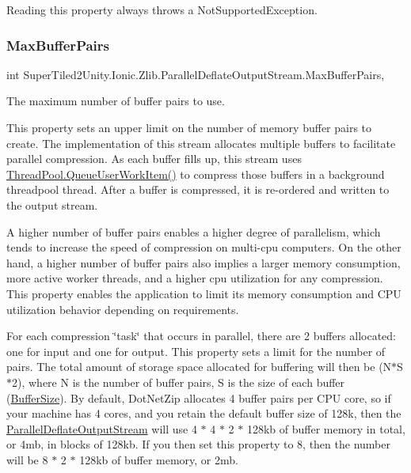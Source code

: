 Reading this property always throws a Not\+Supported\+Exception. 

\mbox{\label{class_super_tiled2_unity_1_1_ionic_1_1_zlib_1_1_parallel_deflate_output_stream_af01b47be83fda8e9e04a009ef8b4b7f2}} 
\subsubsection{\texorpdfstring{Max\+Buffer\+Pairs}{MaxBufferPairs}}
{\footnotesize\ttfamily int Super\+Tiled2\+Unity.\+Ionic.\+Zlib.\+Parallel\+Deflate\+Output\+Stream.\+Max\+Buffer\+Pairs\hspace{0.3cm}{\ttfamily [get]}, {\ttfamily [set]}}



The maximum number of buffer pairs to use. 

This property sets an upper limit on the number of memory buffer pairs to create. The implementation of this stream allocates multiple buffers to facilitate parallel compression. As each buffer fills up, this stream uses \mbox{\hyperlink{}{Thread\+Pool.\+Queue\+User\+Work\+Item()}} to compress those buffers in a background threadpool thread. After a buffer is compressed, it is re-\/ordered and written to the output stream. 

A higher number of buffer pairs enables a higher degree of parallelism, which tends to increase the speed of compression on multi-\/cpu computers. On the other hand, a higher number of buffer pairs also implies a larger memory consumption, more active worker threads, and a higher cpu utilization for any compression. This property enables the application to limit its memory consumption and C\+PU utilization behavior depending on requirements. 

For each compression \char`\"{}task\char`\"{} that occurs in parallel, there are 2 buffers allocated\+: one for input and one for output. This property sets a limit for the number of pairs. The total amount of storage space allocated for buffering will then be (N$\ast$\+S$\ast$2), where N is the number of buffer pairs, S is the size of each buffer (\mbox{\hyperlink{class_super_tiled2_unity_1_1_ionic_1_1_zlib_1_1_parallel_deflate_output_stream_acf40fcb2a35fc142e82004ae56761496}{Buffer\+Size}}). By default, Dot\+Net\+Zip allocates 4 buffer pairs per C\+PU core, so if your machine has 4 cores, and you retain the default buffer size of 128k, then the \mbox{\hyperlink{class_super_tiled2_unity_1_1_ionic_1_1_zlib_1_1_parallel_deflate_output_stream}{Parallel\+Deflate\+Output\+Stream}} will use 4 $\ast$ 4 $\ast$ 2 $\ast$ 128kb of buffer memory in total, or 4mb, in blocks of 128kb. If you then set this property to 8, then the number will be 8 $\ast$ 2 $\ast$ 128kb of buffer memory, or 2mb. 

